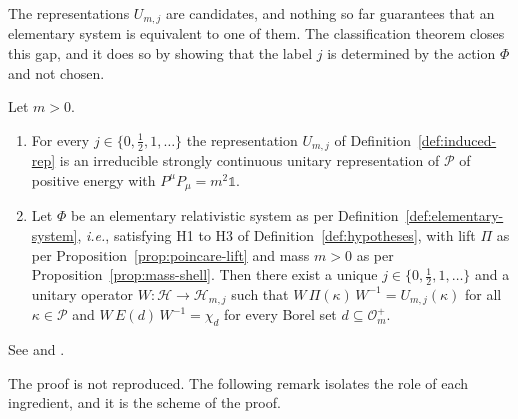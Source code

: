 The representations $U_{m,j}$ are candidates, and nothing so far guarantees that an elementary system is equivalent to one of them. The classification theorem closes this gap, and it does so by showing that the label $j$ is determined by the action $\Phi$ and not chosen.

\begin{theorem}\label{thm:wigner-mackey}
	Let $m>0$.
	\begin{enumerate}
		\item For every $j\in\{0,\tfrac12,1,\dots\}$ the representation $U_{m,j}$ of Definition~\ref{def:induced-rep} is an irreducible strongly continuous unitary representation of $\mathcal{P}$ of positive energy with $P^\mu P_\mu=m^2\mathbb{1}$.
		\item Let $\Phi$ be an elementary relativistic system as per Definition~\ref{def:elementary-system}, \textit{i.e.}, satisfying H1 to H3 of Definition~\ref{def:hypotheses}, with lift $\Pi$ as per Proposition~\ref{prop:poincare-lift} and mass $m>0$ as per Proposition~\ref{prop:mass-shell}. Then there exist a unique $j\in\{0,\tfrac12,1,\dots\}$ and a unitary operator $W:\mathcal{H}\to\mathcal{H}_{m,j}$ such that $W\,\Pi(\kappa)\,W^{-1}=U_{m,j}(\kappa)$ for all $\kappa\in\mathcal{P}$ and $W\,E(d)\,W^{-1}=\chi_d$ for every Borel set $d\subseteq\mathcal{O}_m^+$.
	\end{enumerate}
\end{theorem}

\noindent See \cite[TODO-location]{TODO-Wigner1939} and \cite[TODO-location]{TODO-Mackey1958}.

The proof is not reproduced. The following remark isolates the role of each ingredient, and it is the scheme of the proof.

